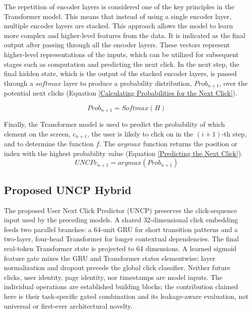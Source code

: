 \documentclass[sn-mathphys-num, Numbered]{sn-jnl}%
\theoremstyle{thmstyleone}%
\theoremstyle{thmstyletwo}%
\theoremstyle{thmstylethree}%
\begin{document}
The repetition of encoder layers is considered one of the key principles in the Transformer model. This means that instead of using a single encoder layer, multiple encoder layers are stacked. This approach allows the model to learn more complex and higher-level features from the data.
It is indicated as the final output after passing through all the encoder layers. These vectors represent higher-level representations of the inputs, which can be utilized for subsequent stages such as computation and predicting the next click.
In the next step, the final hidden state, which is the output of the stacked encoder layers, is passed through a $softmax$ layer to produce a probability distribution, $Prob_{n+1}$, over the potential next clicks (Equation \ref{Calculating Probabilities for the Next Click}).

\begin{equation}\label{Calculating Probabilities for the Next Click}
	Prob_{n+1} = {Softmax}(H)
\end{equation}

Finally, the Transformer model is used to predict the probability of which element on the screen, $c_{n+1}$, the user is likely to click on in the $(i+1)$-th step, and to determine the function $f$. The $argmax$ function returns the position or index with the highest probability value (Equation \ref{Predicting the Next Click}).
\begin{equation}\label{Predicting the Next Click}
	UNCP{c_{n+1}} = argmax(Prob_{n+1})
\end{equation}


\subsection{Proposed UNCP Hybrid}
The proposed User Next Click Predictor (UNCP) preserves the click-sequence input used by the preceding models. A shared 32-dimensional click embedding feeds two parallel branches: a 64-unit GRU for short transition patterns and a two-layer, four-head Transformer for longer contextual dependencies. The final real-token Transformer state is projected to 64 dimensions. A learned sigmoid feature gate mixes the GRU and Transformer states elementwise; layer normalization and dropout precede the global click classifier. Neither future clicks, user identity, page identity, nor timestamps are model inputs. The individual operations are established building blocks; the contribution claimed here is their task-specific gated combination and its leakage-aware evaluation, not universal or first-ever architectural novelty.
\end{document}
